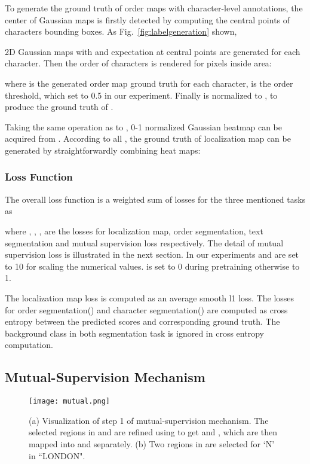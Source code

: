 \documentclass[letterpaper]{article} \usepackage{aaai20}  \usepackage{times}  \usepackage{helvet} \usepackage{courier}  \usepackage[hyphens]{url}  \usepackage{graphicx} \urlstyle{rm} \def\UrlFont{\rm}  \usepackage{graphicx}  \frenchspacing  \setlength{\pdfpagewidth}{8.5in}  \setlength{\pdfpageheight}{11in}
\begin{document}
To generate the ground truth of order maps with character-level annotations, the center of Gaussian maps is firstly detected by computing the central points of characters bounding boxes. As Fig.~\ref{fig:labelgeneration} shown, 

2D Gaussian maps  with  and expectation at central points are generated for each character. Then the order of characters is rendered for pixels inside  area:

where  is the generated order map ground truth for each character,  is the order threshold, which set to 0.5 in our experiment. 
Finally  is normalized to , to produce the ground truth  of .

Taking the same operation as  to , 0-1 normalized Gaussian heatmap  can be acquired from . According to all , the ground truth of localization map  can be generated by straightforwardly combining heat maps:



\subsubsection{Loss Function}

The overall loss function 
is a weighted sum of losses for the three mentioned tasks as

where , , ,  are the losses for localization map, order segmentation, text segmentation and mutual supervision loss respectively. The detail of mutual supervision loss is illustrated in the next section. In our experiments  and  are set to 10 for scaling the numerical values.  is set to 0 during pretraining otherwise to 1.


The localization map loss is computed as an average smooth l1 loss. The losses for order segmentation() and character segmentation() are computed as cross entropy between the predicted scores and corresponding ground truth. The background class in both segmentation task is ignored in cross entropy computation.


\subsection{Mutual-Supervision Mechanism} \label{weakly-supervise}

\begin{figure*}[t]
\centering
\texttt{[image: mutual.png]}
\caption{(a) Visualization of step 1 of mutual-supervision mechanism. The selected regions in  and  are refined using  to get  and , which are then mapped into  and  separately. (b) Two regions in  are selected for `N' in ``LONDON".}
\label{fig:mutual supervision}
\end{figure*}
\end{document}
